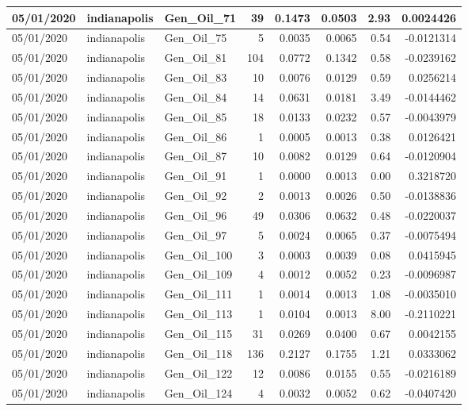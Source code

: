 \documentclass[
  letterpaper,
  DIV=11,
  numbers=noendperiod]{scrartcl}
\begin{document}
\begin{tabular}{l|l|l|r|r|r|r|r}
\hline
05/01/2020 & indianapolis & Gen\_Oil\_71 & 39 & 0.1473 & 0.0503 & 2.93 & 0.0024426\\
\hline
05/01/2020 & indianapolis & Gen\_Oil\_75 & 5 & 0.0035 & 0.0065 & 0.54 & -0.0121314\\
\hline
05/01/2020 & indianapolis & Gen\_Oil\_81 & 104 & 0.0772 & 0.1342 & 0.58 & -0.0239162\\
\hline
05/01/2020 & indianapolis & Gen\_Oil\_83 & 10 & 0.0076 & 0.0129 & 0.59 & 0.0256214\\
\hline
05/01/2020 & indianapolis & Gen\_Oil\_84 & 14 & 0.0631 & 0.0181 & 3.49 & -0.0144462\\
\hline
05/01/2020 & indianapolis & Gen\_Oil\_85 & 18 & 0.0133 & 0.0232 & 0.57 & -0.0043979\\
\hline
05/01/2020 & indianapolis & Gen\_Oil\_86 & 1 & 0.0005 & 0.0013 & 0.38 & 0.0126421\\
\hline
05/01/2020 & indianapolis & Gen\_Oil\_87 & 10 & 0.0082 & 0.0129 & 0.64 & -0.0120904\\
\hline
05/01/2020 & indianapolis & Gen\_Oil\_91 & 1 & 0.0000 & 0.0013 & 0.00 & 0.3218720\\
\hline
05/01/2020 & indianapolis & Gen\_Oil\_92 & 2 & 0.0013 & 0.0026 & 0.50 & -0.0138836\\
\hline
05/01/2020 & indianapolis & Gen\_Oil\_96 & 49 & 0.0306 & 0.0632 & 0.48 & -0.0220037\\
\hline
05/01/2020 & indianapolis & Gen\_Oil\_97 & 5 & 0.0024 & 0.0065 & 0.37 & -0.0075494\\
\hline
05/01/2020 & indianapolis & Gen\_Oil\_100 & 3 & 0.0003 & 0.0039 & 0.08 & 0.0415945\\
\hline
05/01/2020 & indianapolis & Gen\_Oil\_109 & 4 & 0.0012 & 0.0052 & 0.23 & -0.0096987\\
\hline
05/01/2020 & indianapolis & Gen\_Oil\_111 & 1 & 0.0014 & 0.0013 & 1.08 & -0.0035010\\
\hline
05/01/2020 & indianapolis & Gen\_Oil\_113 & 1 & 0.0104 & 0.0013 & 8.00 & -0.2110221\\
\hline
05/01/2020 & indianapolis & Gen\_Oil\_115 & 31 & 0.0269 & 0.0400 & 0.67 & 0.0042155\\
\hline
05/01/2020 & indianapolis & Gen\_Oil\_118 & 136 & 0.2127 & 0.1755 & 1.21 & 0.0333062\\
\hline
05/01/2020 & indianapolis & Gen\_Oil\_122 & 12 & 0.0086 & 0.0155 & 0.55 & -0.0216189\\
\hline
05/01/2020 & indianapolis & Gen\_Oil\_124 & 4 & 0.0032 & 0.0052 & 0.62 & -0.0407420\\

\end{tabular}
\end{document}

